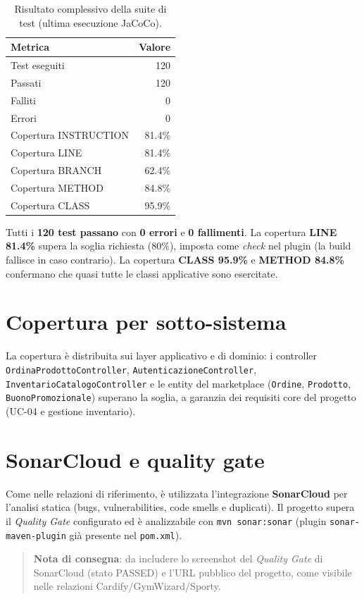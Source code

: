 \begin{table}[H]
    \centering
    \small
    \begin{tabular}{@{}lr@{}} \toprule
        \textbf{Metrica} & \textbf{Valore} \\ \midrule
        Test eseguiti & 120 \\ \midrule
        Passati & 120 \\ \midrule
        Falliti & 0 \\ \midrule
        Errori & 0 \\ \midrule
        Copertura INSTRUCTION & 81.4\% \\ \midrule
        Copertura LINE & 81.4\% \\ \midrule
        Copertura BRANCH & 62.4\% \\ \midrule
        Copertura METHOD & 84.8\% \\ \midrule
        Copertura CLASS & 95.9\% \\ \bottomrule
    \end{tabular}
    \caption{Risultato complessivo della suite di test (ultima esecuzione JaCoCo).}
    \label{tab:testriassunto}
\end{table}

Tutti i \textbf{120 test passano} con \textbf{0 errori} e \textbf{0 fallimenti}.
La copertura \textbf{LINE 81.4\%} supera la soglia richiesta (\(80\%\)),
imposta come \emph{check} nel plugin (la build fallisce in caso contrario). La
copertura \textbf{CLASS 95.9\%} e \textbf{METHOD 84.8\%} confermano che quasi
tutte le classi applicative sono esercitate.

\section{Copertura per sotto-sistema}
\label{sec:testing_copertura}

La copertura è distribuita sui layer applicativo e di dominio: i controller
\texttt{OrdinaProdottoController}, \texttt{AutenticazioneController},
\texttt{InventarioCatalogoController} e le entity del marketplace
(\texttt{Ordine}, \texttt{Prodotto}, \texttt{BuonoPromozionale}) superano la
soglia, a garanzia dei requisiti core del progetto (UC-04 e gestione
inventario).

\section{SonarCloud e quality gate}
\label{sec:testing_sonar}

Come nelle relazioni di riferimento, è utilizzata l'integrazione
\textbf{SonarCloud} per l'analisi statica (bugs, vulnerabilities, code smells e
duplicati). Il progetto supera il \emph{Quality Gate} configurato ed è
analizzabile con \texttt{mvn sonar:sonar} (plugin \texttt{sonar-maven-plugin}
già presente nel \texttt{pom.xml}).

\begin{quote}
\textbf{Nota di consegna}: da includere lo screenshot del \emph{Quality Gate}
di SonarCloud (stato PASSED) e l'URL pubblico del progetto, come visibile nelle
relazioni Cardify/GymWizard/Sporty.
\end{quote}